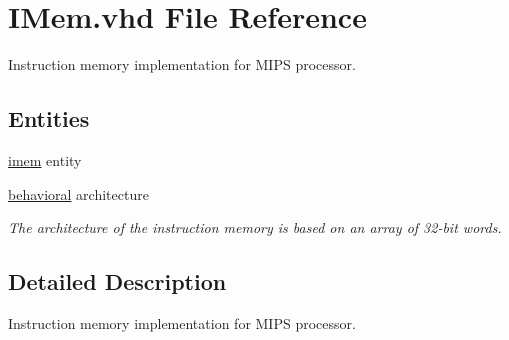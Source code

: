 \hypertarget{_i_mem_8vhd}{\section{\-I\-Mem.\-vhd \-File \-Reference}
\label{_i_mem_8vhd}
}


\-Instruction memory implementation for \-M\-I\-P\-S processor.  


\subsection*{\-Entities}
\begin{DoxyCompactItemize}
\item 
\hyperlink{classimem}{imem} entity
\item 
\hyperlink{classimem_1_1behavioral}{behavioral} architecture
\begin{DoxyCompactList}\small\item\em \-The architecture of the instruction memory is based on an array of 32-\/bit words. \end{DoxyCompactList}\end{DoxyCompactItemize}


\subsection{\-Detailed \-Description}
\-Instruction memory implementation for \-M\-I\-P\-S processor. 